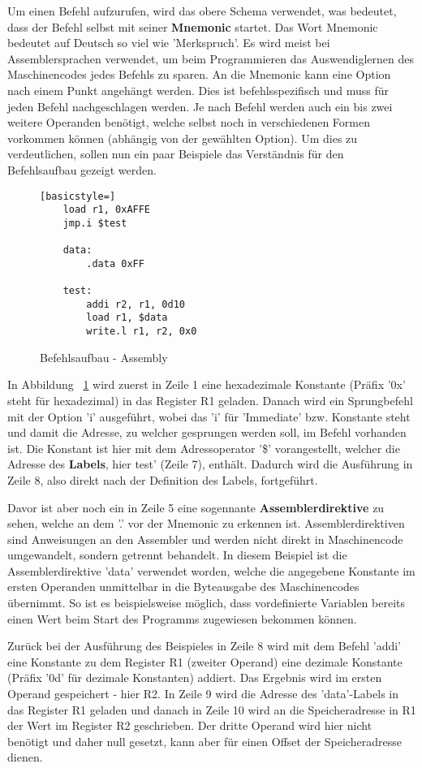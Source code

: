 Um einen Befehl aufzurufen, wird das obere Schema verwendet, was bedeutet, dass
der Befehl selbst mit seiner \textbf{Mnemonic} startet. Das Wort Mnemonic
bedeutet auf Deutsch so viel wie 'Merkspruch'. Es wird meist bei
Assemblersprachen verwendet, um beim Programmieren das Auswendiglernen des
Maschinencodes jedes Befehls zu sparen. An die Mnemonic kann eine Option nach
einem Punkt angehängt werden. Dies ist befehlsspezifisch und muss für jeden
Befehl nachgeschlagen werden. Je nach Befehl werden auch ein bis zwei weitere
Operanden benötigt, welche selbst noch in verschiedenen Formen vorkommen können
(abhängig von der gewählten Option). Um dies zu verdeutlichen, sollen nun ein
paar Beispiele das Verständnis für den Befehlsaufbau gezeigt werden.
\begin{figure}
\begin{lstlisting}[basicstyle=]
	load r1, 0xAFFE
	jmp.i $test

	data:
		.data 0xFF

	test:
		addi r2, r1, 0d10
		load r1, $data
		write.l r1, r2, 0x0
\end{lstlisting}
\caption{Befehlsaufbau - Assembly}
\label{code:instruction_code}
\end{figure}

In Abbildung ~\ref{code:instruction_code} wird zuerst in Zeile 1 eine
hexadezimale Konstante (Präfix '0x' steht für hexadezimal) in das Register R1
geladen. Danach wird ein Sprungbefehl mit der Option 'i' ausgeführt, wobei das
'i' für 'Immediate' bzw. Konstante steht und damit die Adresse, zu welcher
gesprungen werden soll, im Befehl vorhanden ist.  Die Konstant ist hier mit dem
Adressoperator '\$' vorangestellt, welcher die Adresse des \textbf{Labels}, hier
test' (Zeile 7), enthält. Dadurch wird die Ausführung in Zeile 8, also direkt
nach der Definition des Labels, fortgeführt.

Davor ist aber noch ein in Zeile 5 eine sogennante \textbf{Assemblerdirektive}
zu sehen, welche an dem '.' vor der Mnemonic zu erkennen ist.
Assemblerdirektiven sind Anweisungen an den Assembler und werden nicht direkt in
Maschinencode umgewandelt, sondern getrennt behandelt. In diesem Beispiel ist
die Assemblerdirektive 'data' verwendet worden, welche die angegebene Konstante
im ersten Operanden unmittelbar in die Byteausgabe des Maschinencodes übernimmt.
So ist es beispielsweise möglich, dass vordefinierte Variablen bereits einen
Wert beim Start des Programms zugewiesen bekommen können.

Zurück bei der Ausführung des Beispieles in Zeile 8 wird mit dem Befehl 'addi'
eine Konstante zu dem Register R1 (zweiter Operand) eine dezimale Konstante
(Präfix '0d' für dezimale Konstanten) addiert. Das Ergebnis wird im ersten
Operand gespeichert - hier R2. In Zeile 9 wird die Adresse des 'data'-Labels in
das Register R1 geladen und danach in Zeile 10 wird an die Speicheradresse in R1
der Wert im Register R2 geschrieben. Der dritte Operand wird hier nicht benötigt
und daher null gesetzt, kann aber für einen Offset der Speicheradresse dienen.
\pagebreak

